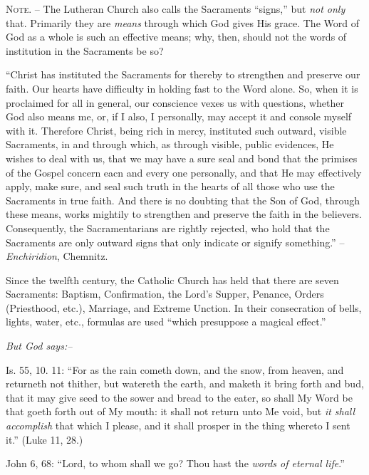 \documentclass[
]{book}
\begin{document}
\textsc{Note. --} The Lutheran Church also calls the Sacraments ``signs,'' but \emph{not only} that. Primarily they are \emph{means} through which God gives His grace. The Word of God as a whole is such an effective means; why, then, should not the words of institution in the Sacraments be so?

``Christ has instituted the Sacraments for thereby to strengthen and preserve our faith. Our hearts have difficulty in holding fast to the Word alone. So, when it is proclaimed for all in general, our conscience vexes us with questions, whether God also means me, or, if I also, I personally, may accept it and console myself with it. Therefore Christ, being rich in mercy, instituted such outward, visible Sacraments, in and through which, as through visible, public evidences, He wishes to deal with us, that we may have a sure seal and bond that the primises of the Gospel concern eacn and every one personally, and that He may effectively apply, make sure, and seal such truth in the hearts of all those who use the Sacraments in true faith. And there is no doubting that the Son of God, through these means, works mightily to strengthen and preserve the faith in the believers. Consequently, the Sacramentarians are rightly rejected, who hold that the Sacraments are only outward signs that only indicate or signify something.'' -- \emph{Enchiridion}, Chemnitz.

Since the twelfth century, the Catholic Church has held that there are seven Sacraments: Baptism, Confirmation, the Lord's Supper, Penance, Orders (Priesthood, etc.), Marriage, and Extreme Unction. In their consecration of bells, lights, water, etc., formulas are used ``which presuppose a magical effect.''

\begin{center}
\textsl{But God says:--}
\end{center}

Is. 55, 10. 11: ``For as the rain cometh down, and the snow, from heaven, and returneth not thither, but watereth the earth, and maketh it bring forth and bud, that it may give seed to the sower and bread to the eater, so shall My Word be that goeth forth out of My mouth: it shall not return unto Me void, but \emph{it shall accomplish} that which I please, and it shall prosper in the thing whereto I sent it.'' (Luke 11, 28.)

John 6, 68: ``Lord, to whom shall we go? Thou hast the \emph{words of eternal life}.''
\end{document}
